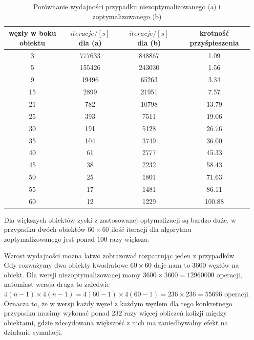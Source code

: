 \documentclass[12pt, letterpaper]{report}
\begin{document}
    \begin{table}[H]
        \centering
        \begin{tabular}{||c c c c||} 
            \hline
            węzły w boku obiektu & $iteracje / [s]$ dla (a) & $iteracje / [s]$ dla (b) & krotność przyśpieszenia \\ [0.5ex] 
            \hline\hline
            3 & 777633 & 848867 & 1.09 \\ 
            \hline
            5 & 155426 & 243030 & 1.56 \\
            \hline
            9 & 19496 & 65263 & 3.34 \\
            \hline
            15 & 2899 & 21951 & 7.57 \\
            \hline
            21 & 782 & 10798 & 13.79 \\
            \hline
            25 & 393 & 7511 & 19.06 \\
            \hline
            30 & 191 & 5128 & 26.76 \\
            \hline
            35 & 104 & 3749 & 36.00 \\
            \hline
            40 & 61 & 2777 & 45.33 \\ 
            \hline
            45 & 38 & 2232 & 58.43 \\ 
            \hline
            50 & 25 & 1801 & 71.63 \\
            \hline
            55 & 17 & 1481 & 86.11 \\ 
            \hline
            60 & 12 & 1229 & 100.88 \\ [1ex] 
            \hline
        \end{tabular}
        \caption{ Porównanie wydajności przypadku niezoptymalizowanego (a) i zoptymalizowanego (b) }
    \end{table}
    Dla większych obiektów zyski z zastosowanej optymalizacji są bardzo duże, w przypadku dwóch obiektów
    $60 \times 60$ ilość iteracji dla algorytmu zoptymalizowanego jest ponad $100$ razy większa.

    Wzrost wydajności można łatwo zobrazować rozpatrując jeden z przypadków. Gdy rozważymy dwa 
    obiekty kwadratowe $60 \times 60$ daje nam to $3600$ węzłów na obiekt.
    Dla wersji niezoptymalizowanej mamy $3600 \times 3600 = 12960000$ operacji, natomiast wersja druga to zaledwie
    $4(n - 1) \times 4(n - 1) = 4(60 - 1) \times 4(60 - 1) = 236 \times 236 = 55696$ operacji. Oznacza to, że 
    w wersji każdy węzeł z każdym węzłem dla tego konkretnego przypadku musimy wykonać ponad $232$ razy więcej obliczeń
    kolizji między obiektami, gdzie zdecydowana większość z nich ma zaniedbywalny efekt na działanie symulacji. \\
\end{document}
